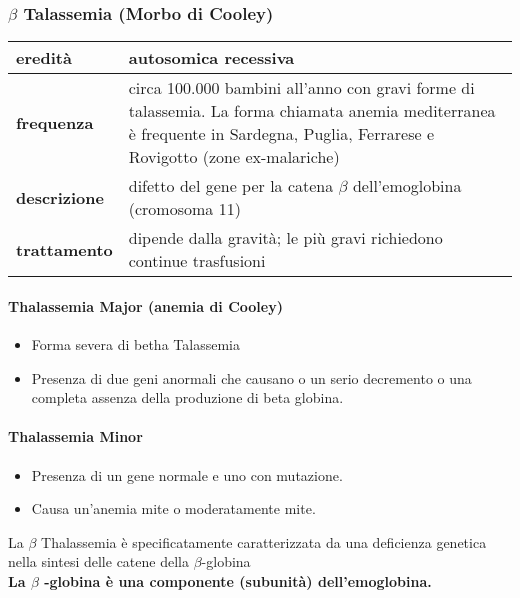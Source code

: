 \documentclass{article}
\begin{document}
\subsubsection{$\beta$ Talassemia (Morbo di Cooley)}
\begin{center}
    \begin{tabular}{lp{}}
        \toprule
        \textbf{eredità} & autosomica recessiva\\
        \midrule
        \textbf{frequenza} & circa 100.000 bambini all'anno con gravi forme di talassemia. La forma
        chiamata anemia mediterranea è frequente in Sardegna, Puglia, Ferrarese e Rovigotto (zone ex-malariche)\\
        \midrule
        \textbf{descrizione} & difetto del gene per la catena $\beta$ dell'emoglobina (cromosoma 11)\\
        \midrule
        \textbf{trattamento} & dipende dalla gravità; le più gravi
        richiedono continue trasfusioni \\
        \bottomrule
    \end{tabular}
\end{center}
\paragraph{Thalassemia Major (anemia di Cooley)}
\begin{itemize}
    \item Forma severa di betha Talassemia
    \item Presenza di due geni anormali che causano o un serio decremento o una completa assenza della produzione di beta globina.
\end{itemize}
\paragraph{Thalassemia Minor}
\begin{itemize}
    \item Presenza di un gene normale e uno con mutazione.
    \item Causa un'anemia mite o moderatamente mite.
\end{itemize}
La $\beta$  Thalassemia è specificatamente caratterizzata da una deficienza genetica nella sintesi delle catene della $\beta$-globina\\
\textbf{La $\beta$ -globina è una componente (subunità) dell'emoglobina.}
\end{document}
